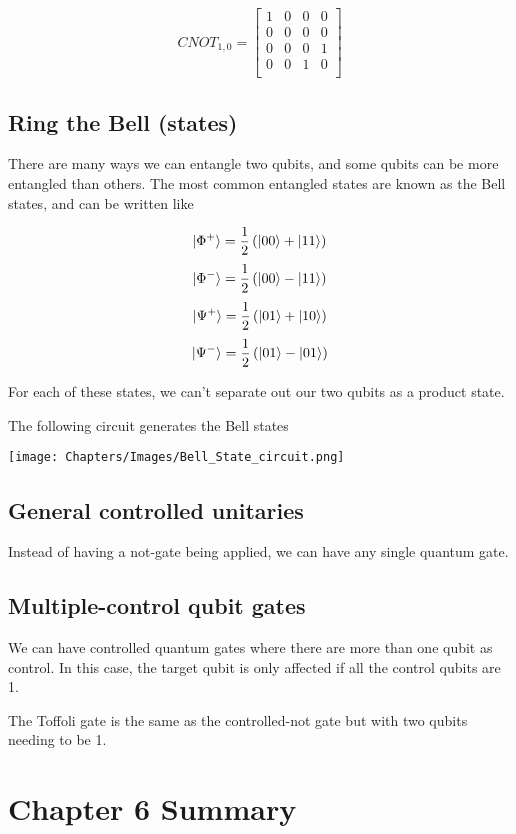\documentclass{book}
\begin{document}
$$
CNOT_{1, 0} = \begin{bmatrix} 1 & 0 & 0 & 0 \\
0 & 0 & 0 & 0 \\
0 & 0 & 0 & 1 \\
0 & 0 & 1 & 0 \\
\end{bmatrix}
$$


\subsection{ Ring the Bell (states)}


There are many ways we can entangle two qubits, and some qubits can be more entangled than others. The most common entangled states are known as the Bell states, and can be written like

$$ \ket{\Phi^+} = \frac{1}{2} \left( \ket{00} + \ket{11} \right) $$
$$ \ket{\Phi^-} = \frac{1}{2} \left( \ket{00} - \ket{11} \right) $$
$$ \ket{\Psi^+} = \frac{1}{2} \left( \ket{01} + \ket{10} \right) $$
$$ \ket{\Psi^-} = \frac{1}{2} \left( \ket{01} - \ket{01} \right) $$

For each of these states, we can't separate out our two qubits as a product state. 


The following circuit generates the Bell states

\texttt{[image: Chapters/Images/Bell\_State\_circuit.png]}


\subsection{General controlled unitaries }

Instead of having a not-gate being applied, we can have any single quantum gate. 

\subsection{Multiple-control qubit gates }

We can have controlled quantum gates where there are more than one qubit as control. In this case, the target qubit is only affected if all the control qubits are 1. 

The Toffoli gate is the same as the controlled-not gate but with two qubits needing to be 1.

\section{Chapter 6 Summary}
\end{document}
